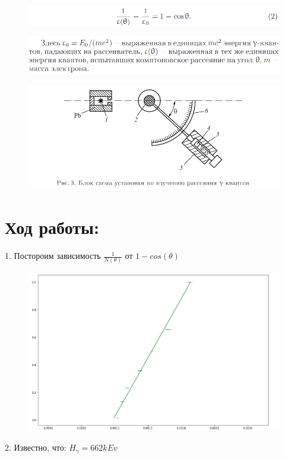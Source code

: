 \documentclass{article}
\theoremstyle{remark}
\begin{document}
\begin{figure}[htp]
    \includegraphics[width=1.2\linewidth]{29.png}
\end{figure}
\begin{figure}[htp]
    \includegraphics[width=1.2\linewidth]{30.png}
\end{figure}
\begin{figure}[htp]
    \includegraphics[width=1.2\linewidth]{31.png}
\end{figure}
\clearpage
\section{Ход работы:}

1. Постороим зависимость $\frac{1}{N(\theta)}$ от $1 - cos(\theta)$
\begin{figure}[htp]
    \includegraphics[width=1.2\linewidth]{36.png}
\end{figure}
2. Известно, что: $H_\gamma = 662 kEv$
\end{document}
